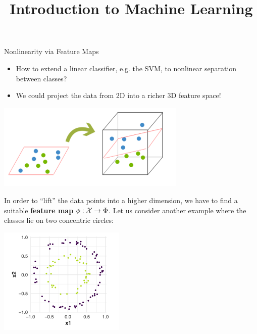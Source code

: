 




\newcommand{\titlefigure}{figure_man/kernel_intro_2.png}
\newcommand{\learninggoals}{
  \item \textcolor{blue}{XXX}
  \item \textcolor{blue}{XXX}
}

\title{Introduction to Machine Learning}
\date{}





\begin{vbframe}{Nonlinearity via Feature Maps}
\begin{itemize}
\item How to extend a linear classifier, e.g. the SVM, to nonlinear separation between classes? 
\item We could project the data from 2D into a richer 3D feature space!
\end{itemize}

\vspace{1cm} 
\begin{center}
\includegraphics[width=9cm]{figure_man/kernels/svm_dummies_kernelling.PNG}
\end{center}

\framebreak 


  In order to \enquote{lift} the data points into a higher dimension, we have to find a suitable \textbf{feature map} $\phi : \mathcal{X} \to \Phi$.
Let us consider another example where the classes lie on two concentric circles:

\begin{center}
\includegraphics[width=6cm]{figure_man/kernel_intro_1.png}
\end{center}


\end{vbframe}
